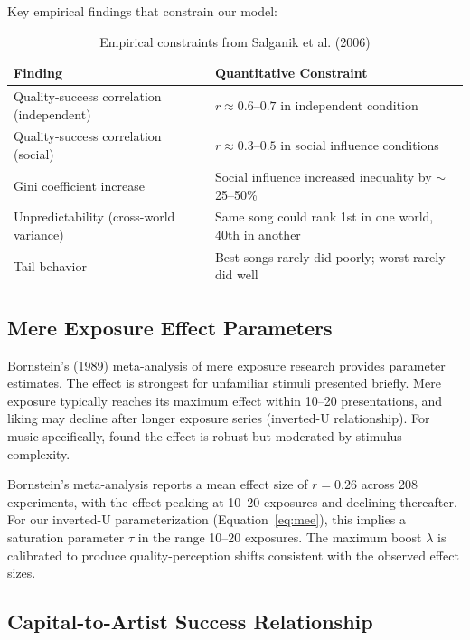 \documentclass[11pt,a4paper]{article}
\begin{document}
Key empirical findings that constrain our model:

\begin{table}[H]
\centering
\caption{Empirical constraints from Salganik et al. (2006)}
\label{tab:salganik}
\begin{tabular}{@{}ll@{}}
\toprule
\textbf{Finding} & \textbf{Quantitative Constraint} \\
\midrule
Quality-success correlation (independent) & $r \approx 0.6$--$0.7$ in independent condition \\
Quality-success correlation (social) & $r \approx 0.3$--$0.5$ in social influence conditions \\
Gini coefficient increase & Social influence increased inequality by $\sim$25--50\% \\
Unpredictability (cross-world variance) & Same song could rank 1st in one world, 40th in another \\
Tail behavior & Best songs rarely did poorly; worst rarely did well \\
\bottomrule
\end{tabular}
\end{table}

\subsection{Mere Exposure Effect Parameters}

Bornstein's (1989) meta-analysis of mere exposure research provides parameter estimates. The effect is strongest for unfamiliar stimuli presented briefly. Mere exposure typically reaches its maximum effect within 10--20 presentations, and liking may decline after longer exposure series (inverted-U relationship). For music specifically, \citet{szpunar2004} found the effect is robust but moderated by stimulus complexity.

Bornstein's meta-analysis reports a mean effect size of $r = 0.26$ across 208 experiments, with the effect peaking at 10--20 exposures and declining thereafter. For our inverted-U parameterization (Equation~\ref{eq:mee}), this implies a saturation parameter $\tau$ in the range 10--20 exposures. The maximum boost $\lambda$ is calibrated to produce quality-perception shifts consistent with the observed effect sizes.

\subsection{Capital-to-Artist Success Relationship}
\end{document}
